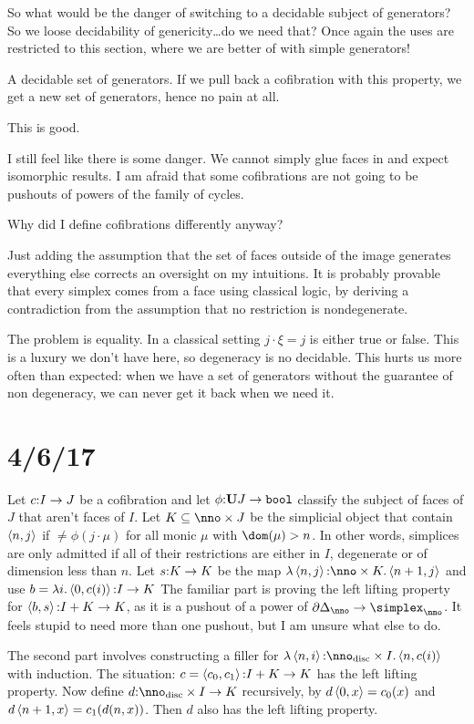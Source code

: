 \documentclass[csh.tex]{subfiles}
\begin{document}
So what would be the danger of switching to a decidable subject of generators?
So we loose decidability of genericity\dots do we need that?
Once again the uses are restricted to this section, where we are better of with simple generators!

A decidable set of generators. If we pull back a cofibration with this property, we get a new set of generators, hence no pain at all.

This is good.

I still feel like there is some danger. We cannot simply glue faces in and expect isomorphic results. I am afraid that some cofibrations are not going to be pushouts of powers of the family of cycles.

Why did I define cofibrations differently anyway?

Just adding the assumption that the set of faces outside of the image generates everything else corrects an oversight on my intuitions. It is probably provable that every simplex comes from a face using classical logic, by deriving a contradiction from the assumption that no restriction is nondegenerate.

The problem is equality. In a classical setting $j\cdot \xi = j$ is either true or false. This is a luxury we don't have here, so degeneracy is no decidable. This hurts us more often than expected: when we have a set of generators without the guarantee of non degeneracy, we can never get it back when we need it.

\section{4/6/17}
Let $c\mathord : I\to J$ be a cofibration and let $\phi\mathord :\mathbf{U} J\to\mathtt{bool}$ classify the subject of faces of $J$ that aren't faces of $I$.
Let $K\subseteq \nno\times J$ be the simplicial object that contain $\left\langle n,j \right\rangle$ if $\neq\phi(j\cdot\mu)$ for all monic $\mu$ with $\dom(\mu) > n$.
In other words, simplices are only admitted if all of their restrictions are either in $I$, degenerate or of dimension less than $n$.
Let $s\mathord : K\to K$ be the map $\function{\tuplet{n,j}\of \nno\times K}\tuplet{n + 1,j}$ and use $b = \lambda i .\left\langle 0,c(i) \right\rangle\mathord : I\to K$
The familiar part is proving the left lifting property for $\left\langle b,s \right\rangle\mathord : I + K\to K$, as it is a pushout of a power of $\cycle_\nno \to \simplex_\nno$.
It feels stupid to need more than one pushout, but I am unsure what else to do.

The second part involves constructing a filler for $\function{\tuplet{n,i}\of \nno\disc\times I}\tuplet{n,c(i)}$ with induction.
The situation: $c=\left\langle c_0,c_1 \right\rangle\mathord : I + K\to K$ has the left lifting property. Now define $d\of\nno\disc\times I\to K$ recursively, by $d\left\langle 0,x \right\rangle = c_0(x)$ and $d\left\langle n + 1, x \right\rangle = c_1(d(n,x))$. Then $d$ also has the left lifting property.
\end{document}
